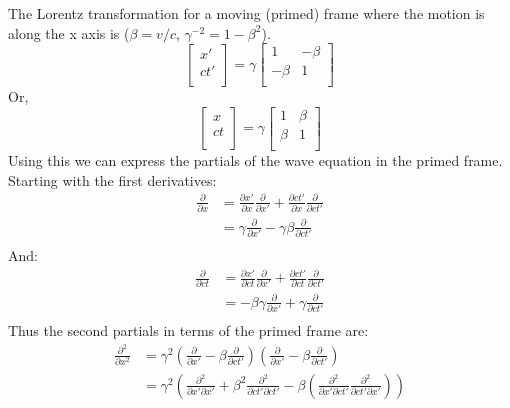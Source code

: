 The Lorentz transformation for a moving (primed) frame where the motion is
along the x axis is (\(\beta = v/c\), \(\gamma^{-2} = 1 -\beta^2\)).
%
\begin{equation*}
\begin{bmatrix}
x' \\
c t' \\
\end{bmatrix}
=
\gamma
\begin{bmatrix}
1 & -\beta \\
-\beta & 1 \\
\end{bmatrix}
\end{equation*}
%
Or,
\begin{equation*}
\begin{bmatrix}
x \\
c t \\
\end{bmatrix}
=
\gamma
\begin{bmatrix}
1 & \beta \\
\beta & 1 \\
\end{bmatrix}
\end{equation*}
%
Using this we can express the partials of the wave equation in the
primed frame.  Starting with the first derivatives:
%
\begin{equation}\label{eqn:lorentz:160}
\begin{aligned}
\frac{\partial}{\partial x}
&= \frac{\partial x'}{\partial x} \frac{\partial}{\partial x'} + \frac{\partial c t'}{\partial x} \frac{\partial}{\partial c t'} \\
&= \gamma \frac{\partial}{\partial x'} - \gamma \beta \frac{\partial}{\partial c t'} \\
\end{aligned}
\end{equation}
%
And:
%
\begin{equation}\label{eqn:lorentz:180}
\begin{aligned}
\frac{\partial}{\partial ct}
&= \frac{\partial x'}{\partial ct} \frac{\partial}{\partial x'} + \frac{\partial c t'}{\partial ct} \frac{\partial}{\partial c t'} \\
&= -\beta \gamma \frac{\partial}{\partial x'} + \gamma \frac{\partial}{\partial c t'} \\
\end{aligned}
\end{equation}
%
Thus the second partials in terms of the primed frame are:
%
\begin{equation}\label{eqn:lorentz:200}
\begin{aligned}
\frac{\partial^2}{\partial x^2}
&= \gamma^2
\left(\frac{\partial}{\partial x'} - \beta \frac{\partial}{\partial c t'} \right)
\left(\frac{\partial}{\partial x'} - \beta \frac{\partial}{\partial c t'} \right)
\\
&= \gamma^2
\left(
\frac{\partial^2}{\partial x'\partial x'} + \beta^2 \frac{\partial^2}{\partial c t'\partial c t'}
- \beta \left(
\frac{\partial^2}{\partial x' \partial c t'}
\frac{\partial^2}{\partial c t' \partial x'}
\right)
\right)
\\
\end{aligned}
\end{equation}
